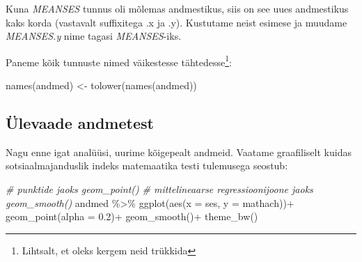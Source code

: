 \documentclass[
]{book}
\newenvironment{Shaded}{\begin{snugshade}}{\end{snugshade}}
\newcommand{\AttributeTok}[1]{\textcolor[rgb]{0.77,0.63,0.00}{#1}}
\newcommand{\CommentTok}[1]{\textcolor[rgb]{0.56,0.35,0.01}{\textit{#1}}}
\newcommand{\ConstantTok}[1]{\textcolor[rgb]{0.00,0.00,0.00}{#1}}
\newcommand{\FloatTok}[1]{\textcolor[rgb]{0.00,0.00,0.81}{#1}}
\newcommand{\FunctionTok}[1]{\textcolor[rgb]{0.00,0.00,0.00}{#1}}
\newcommand{\NormalTok}[1]{#1}
\newcommand{\OtherTok}[1]{\textcolor[rgb]{0.56,0.35,0.01}{#1}}
\newcommand{\SpecialCharTok}[1]{\textcolor[rgb]{0.00,0.00,0.00}{#1}}
\begin{document}
Kuna \emph{MEANSES} tunnus oli mõlemas andmestikus, siis on see uues andmestikus kaks korda (vastavalt suffixitega .x ja .y). Kustutame neist esimese ja muudame \emph{MEANSES.y} nime tagasi \emph{MEANSES}-iks.

\begin{Shaded}
\end{Shaded}

Paneme kõik tunnuste nimed väikestesse tähtedesse\footnote{Lihtsalt, et oleks kergem neid trükkida}:

\begin{Shaded}
\begin{Highlighting}[]
\FunctionTok{names}\NormalTok{(andmed) }\OtherTok{\textless{}{-}} \FunctionTok{tolower}\NormalTok{(}\FunctionTok{names}\NormalTok{(andmed))}
\end{Highlighting}
\end{Shaded}

\hypertarget{uxfclevaade-andmetest}{%
\subsection{Ülevaade andmetest}\label{uxfclevaade-andmetest}}

Nagu enne igat analüüsi, uurime kõigepealt andmeid. Vaatame graafiliselt kuidas sotsiaalmajanduslik indeks matemaatika testi tulemusega seostub:

\begin{Shaded}
\begin{Highlighting}[]
\CommentTok{\# punktide jaoks geom\_point()}
\CommentTok{\# mittelineaarse regressioonijoone jaoks geom\_smooth()}
\NormalTok{andmed }\SpecialCharTok{\%\textgreater{}\%} 
  \FunctionTok{ggplot}\NormalTok{(}\FunctionTok{aes}\NormalTok{(}\AttributeTok{x =}\NormalTok{ ses, }\AttributeTok{y =}\NormalTok{ mathach))}\SpecialCharTok{+}
  \FunctionTok{geom\_point}\NormalTok{(}\AttributeTok{alpha =} \FloatTok{0.2}\NormalTok{)}\SpecialCharTok{+}
  \FunctionTok{geom\_smooth}\NormalTok{()}\SpecialCharTok{+}
  \FunctionTok{theme\_bw}\NormalTok{()}
\end{Highlighting}
\end{Shaded}
\end{document}
